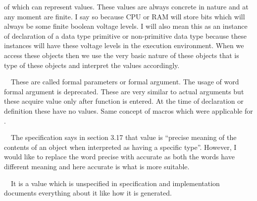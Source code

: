   of which can represent values. These values are always concrete in
  nature and at any moment are finite. I say so because CPU or RAM
  will store bits which will always be some finite boolean voltage
  levels. I will also mean this as an instance of declaration of a
  data type primitive or non-primitive data type because these
  instances will have these voltage levels in the execution
  environment. When we access \at[access] these objects then we use
  the very basic nature of these objects that is type of these objects
  and interpret the values accordingly.
\item{}\textreference[parameter]~~These are called
  formal parameters or formal argument. The usage of word formal
  argument is deprecated. These are very similar to actual arguments
  but these acquire value only after function is entered. At the time
  of declaration or definition these have no values. Same concept of
  macros which were applicable for \at[argument].
\item{}\textreference[value]~~The specification says in
  section 3.17 that value is ``precise meaning of the contents of an
  object when interpreted as having a specific type''. However, I
  would like to replace the word precise with accurate as both the
  words have different meaning and here accurate is what is more
  suitable.
\startitemize[R]
\item{}~~It is a value
  which is unspecified in specification and implementation documents
  everything about it like how it is generated.

\stopitemize
\stopitemize
